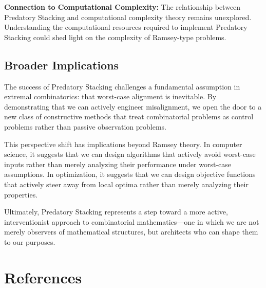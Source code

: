 \documentclass[12pt]{article}
\begin{document}
\textbf{Connection to Computational Complexity:} The relationship between Predatory Stacking and computational complexity theory remains unexplored. Understanding the computational resources required to implement Predatory Stacking could shed light on the complexity of Ramsey-type problems.

\subsection{Broader Implications}
The success of Predatory Stacking challenges a fundamental assumption in extremal combinatorics: that worst-case alignment is inevitable. By demonstrating that we can actively engineer misalignment, we open the door to a new class of constructive methods that treat combinatorial problems as control problems rather than passive observation problems.

This perspective shift has implications beyond Ramsey theory. In computer science, it suggests that we can design algorithms that actively avoid worst-case inputs rather than merely analyzing their performance under worst-case assumptions. In optimization, it suggests that we can design objective functions that actively steer away from local optima rather than merely analyzing their properties.

Ultimately, Predatory Stacking represents a step toward a more active, interventionist approach to combinatorial mathematics—one in which we are not merely observers of mathematical structures, but architects who can shape them to our purposes.

\section*{References}
\end{document}
